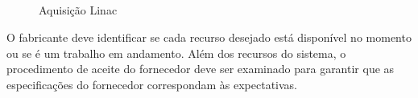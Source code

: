 \documentclass[11pt,a4paper]{article}
\begin{document}
	\begin{figure}[!h]
		\centering

		 \\ %
		 \\%
		 \\%
		 \\%
		\caption{Aquisição Linac}
		\label{fig:aquisicaoLinac}
	\end{figure}

	O fabricante deve identificar se cada recurso desejado está disponível no momento ou se é um trabalho em andamento. Além dos recursos do sistema, o procedimento de aceite do fornecedor deve ser examinado para garantir que as especificações do fornecedor correspondam às expectativas.
\end{document}
